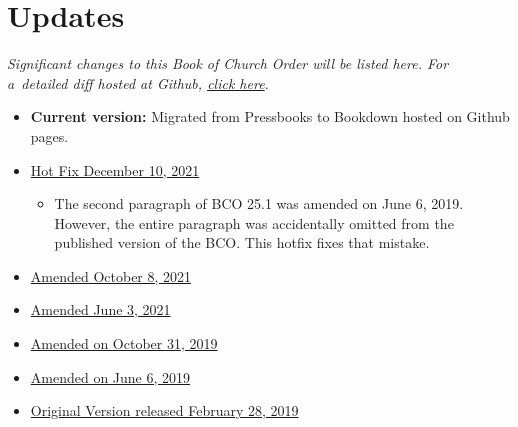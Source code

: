 \documentclass[
]{book}
\providecommand{\tightlist}{%
  \setlength{\itemsep}{0pt}\setlength{\parskip}{0pt}}
\begin{document}
\hypertarget{updates}{%
\chapter*{Updates}\label{updates}}

\emph{Significant changes to this Book of Church Order will be listed here. For a~detailed diff hosted at Github, \href{https://github.com/Evangel-Presbytery/evangel-bco}{click here}.}

\begin{itemize}
\tightlist
\item
  \textbf{Current version:} Migrated from Pressbooks to Bookdown hosted on Github pages.
\item
  \href{https://www.dropbox.com/sh/e5lszl09qec2wy0/AADMEzOS1C1Z7Ao4r4xyddHNa?dl=0}{Hot Fix December 10, 2021}

  \begin{itemize}
  \tightlist
  \item
    The second paragraph of BCO 25.1 was amended on June 6, 2019. However, the entire paragraph was accidentally omitted from the published version of the BCO. This hotfix fixes that mistake.
  \end{itemize}
\item
  \href{https://www.dropbox.com/sh/67fg23e5sksui6j/AAB6LRjZ2dld47gYz1G0jo-Fa?dl=0}{Amended October 8, 2021}
\item
  \href{https://www.dropbox.com/sh/z9buy77lg1ay8t0/AAAnPPQysyhwRPJ7lpLxl3Bma?dl=0}{Amended June 3, 2021}
\item
  \href{https://www.dropbox.com/sh/yhg7o7s6vlx0jha/AABM5so3BTahNcU7rUWsZHAGa?dl=0}{Amended on October 31, 2019}
\item
  \href{https://www.dropbox.com/sh/6e1mcd2n8vojvpv/AADWRZsciqNw1xteiuRA0lr3a?dl=0}{Amended on June 6, 2019}
\item
  \href{https://www.dropbox.com/sh/w46pitp7sevpepk/AAAH_HDpb8Qpck42Dkfw661Za?dl=0}{Original Version released February 28, 2019}
\end{itemize}
\end{document}
